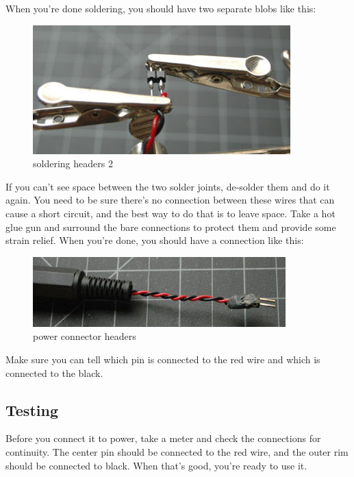 When you're done soldering, you should have two separate blobs like this:

\begin{figure}[!htb]
     \centering
     \includegraphics[scale=2.5]{img/soldering/soldering_headers_2.jpg}
     \caption{soldering headers 2}
     \label{soldering headers 2}
\end{figure}



If you can't see space between the two solder joints, de-solder them and do it again. You need to be sure there's no connection between these wires that can cause a short circuit, and the best way to do that is to leave space.
Take a hot glue gun and surround the bare connections to protect them and provide some strain relief. When you're done, you should have a connection like this:

\begin{figure}[!htb]
     \centering
     \includegraphics[scale=2.5]{img/soldering/power_conn_headers.jpg}
     \caption{power connector headers}
     \label{power connector headers}
\end{figure}

Make sure you can tell which pin is connected to the red wire and which is connected to the black.

\subsection{Testing}

Before you connect it to power, take a meter and check the connections for continuity. The center pin should be connected to the red wire, and the outer rim should be connected to black. When that's good, you're ready to use it.
